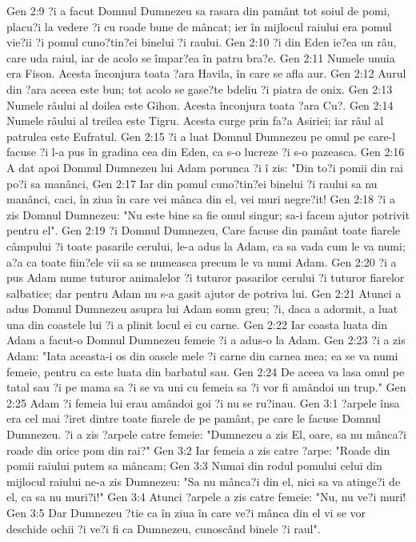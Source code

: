 Gen 2:9  ?i a facut Domnul Dumnezeu sa rasara din pamânt tot soiul de pomi, placu?i la vedere ?i cu roade bune de mâncat; ier în mijlocul raiului era pomul vie?ii ?i pomul cuno?tin?ei binelui ?i raului.
Gen 2:10  ?i din Eden ie?ea un râu, care uda raiul, iar de acolo se împar?ea în patru bra?e.
Gen 2:11  Numele unuia era Fison. Acesta înconjura toata ?ara Havila, în care se afla aur.
Gen 2:12  Aurul din ?ara aceea este bun; tot acolo se gase?te bdeliu ?i piatra de onix.
Gen 2:13  Numele râului al doilea este Gihon. Acesta înconjura toata ?ara Cu?.
Gen 2:14  Numele râului al treilea este Tigru. Acesta curge prin fa?a Asiriei; iar râul al patrulea este Eufratul.
Gen 2:15  ?i a luat Domnul Dumnezeu pe omul pe care-l facuse ?i l-a pus în gradina cea din Eden, ca s-o lucreze ?i s-o pazeasca.
Gen 2:16  A dat apoi Domnul Dumnezeu lui Adam porunca ?i î zis: "Din to?i pomii din rai po?i sa manânci,
Gen 2:17  Iar din pomul cuno?tin?ei binelui ?i raului sa nu manânci, caci, în ziua în care vei mânca din el, vei muri negre?it!
Gen 2:18  ?i a zis Domnul Dumnezeu: "Nu este bine sa fie omul singur; sa-i facem ajutor potrivit pentru el".
Gen 2:19  ?i Domnul Dumnezeu, Care facuse din pamânt toate fiarele câmpului ?i toate pasarile cerului, le-a adus la Adam, ca sa vada cum le va numi; a?a ca toate fiin?ele vii sa se numeasca precum le va numi Adam.
Gen 2:20  ?i a pus Adam nume tuturor animalelor ?i tuturor pasarilor cerului ?i tuturor fiarelor salbatice; dar pentru Adam nu s-a gasit ajutor de potriva lui.
Gen 2:21  Atunci a adus Domnul Dumnezeu asupra lui Adam somn greu; ?i, daca a adormit, a luat una din coastele lui ?i a plinit locul ei cu carne.
Gen 2:22  Iar coasta luata din Adam a facut-o Domnul Dumnezeu femeie ?i a adus-o la Adam.
Gen 2:23  ?i a zis Adam: "Iata aceasta-i os din oasele mele ?i carne din carnea mea; ea se va numi femeie, pentru ca este luata din barbatul sau.
Gen 2:24  De aceea va lasa omul pe tatal sau ?i pe mama sa ?i se va uni cu femeia sa ?i vor fi amândoi un trup."
Gen 2:25  Adam ?i femeia lui erau amândoi goi ?i nu se ru?inau.
Gen 3:1  ?arpele însa era cel mai ?iret dintre toate fiarele de pe pamânt, pe care le facuse Domnul Dumnezeu. ?i a zis ?arpele catre femeie: "Dumnezeu a zis El, oare, sa nu mânca?i roade din orice pom din rai?"
Gen 3:2  Iar femeia a zis catre ?arpe: "Roade din pomii raiului putem sa mâncam;
Gen 3:3  Numai din rodul pomului celui din mijlocul raiului ne-a zis Dumnezeu: "Sa nu mânca?i din el, nici sa va atinge?i de el, ca sa nu muri?i!"
Gen 3:4  Atunci ?arpele a zis catre femeie: "Nu, nu ve?i muri!
Gen 3:5  Dar Dumnezeu ?tie ca în ziua în care ve?i mânca din el vi se vor deschide ochii ?i ve?i fi ca Dumnezeu, cunoscând binele ?i raul".

